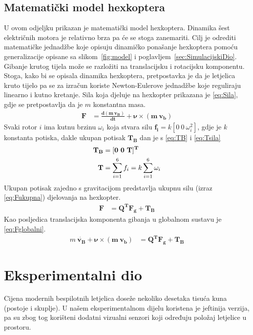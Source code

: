 \documentclass[times, utf8, diplomski]{fer}
\begin{document}
{\subsection{Matematički model hexkoptera}
U ovom odjeljku prikazan je matematički model hexkoptera. Dinamika šest električnih motora je relativno brza pa će se stoga zanemariti. Cilj je odrediti matematičke jednadžbe koje opisuju dinamičko ponašanje hexkoptera pomoću generalizacije opisane sa slikom~\ref{fig:model} i poglavljem~\ref{sec:SimulacijskiDio}. Gibanje krutog tijela može se razložiti na translacijsku i rotacijsku komponentu. Stoga, kako bi se opisala dinamika hexkoptera, pretpostavka je da je letjelica kruto tijelo pa se za izračun koriste Newton-Eulerove jednadžbe koje reguliraju linearno i kutno kretanje. Sila koja djeluje na hexkopter prikazana je \ref{eq:Sila}, gdje se pretpostavlja da je $m$ konstantna masa.
\begin{align}
\mathbf{F}&=\mathbf{\frac{d(m~v_B)}{dt}+\nu\times (m~v_b)} \label{eq:Sila}
\end{align}
Svaki rotor $i$ ima kutnu brzinu $\omega_i$ koja stvara silu $\mathbf{f_i}=k[0 ~0 ~\omega^2_i]$, gdje je $k$ konstanta potiska, dakle ukupan potisak  $\mathbf{T_B}$ dan je s \ref{eq:TB} i \ref{eq:Tsila}
\begin{align}
\centering
\mathbf{T_B}&=\mathbf{[0 ~0 ~T]^T} \label{eq:TB} \\
\mathbf{T}&=\sum_{i=1}^{6}f_i=k\sum_{i=1}^{6}\omega_i \label{eq:Tsila}
\end{align}
Ukupan potisak zajedno s gravitacijom predstavlja ukupnu silu (izraz \ref{eq:Fukupna}) djelovanja na hexkopter.
\begin{align}
\mathbf{F}&=\mathbf{Q^TF_g+T_B} \label{eq:Fukupna}
\end{align}
Kao posljedica translacijska komponenta gibanja u globalnom sustavu je \ref{eq:Fglobalni}.
\begin{align}
m~\mathbf{\dot{v_B}+\nu\times (m~v_b)}&=\mathbf{Q^TF_g+T_B} \label{eq:Fglobalni}
\end{align}



\section{Eksperimentalni dio}
Cijena modernih bespilotnih letjelica doseže nekoliko desetaka tisuća kuna (postoje i skuplje). U našem eksperimentalnom dijelu koristena je jeftinija verzija, pa su zbog tog korišteni dodatni vizualni senzori koji određuju položaj letjelice u prostoru.  
 
}
\end{document}

